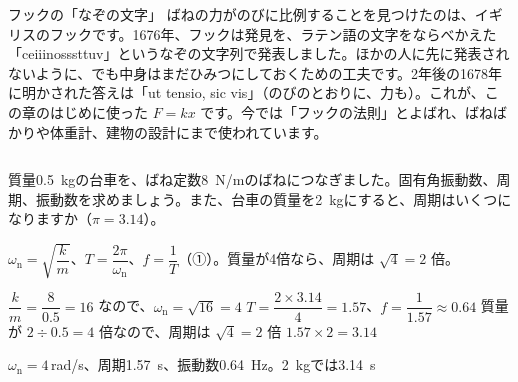 \begin{kotoba}
\small
{}
\end{kotoba}

{}

\begin{column}{フックの「なぞの文字」}
ばねの力がのびに比例することを見つけたのは、イギリスのフックです。1676年、フックは発見を、ラテン語の文字をならべかえた「\mbox{ceiiinosssttuv}」というなぞの文字列で発表しました。ほかの人に先に発表されないように、でも中身はまだひみつにしておくための工夫です。2年後の1678年に明かされた答えは「ut tensio, sic vis」（のびのとおりに、力も）。これが、この章のはじめに使った $F=kx$ です。今では「フックの法則」とよばれ、ばねばかりや体重計、建物の設計にまで使われています。
\end{column}


\begin{reidai}[ばねの固有角振動数と周期]
質量\qty{0.5}{kg}の台車を、ばね定数\qty{8}{N/m}のばねにつなぎました。固有角振動数、周期、振動数を求めましょう。また、台車の質量を\qty{2}{kg}にすると、周期はいくつになりますか（$\pi=3.14$）。\par
\kangaekata $\omega_{\mathrm n}=\sqrt{\dfrac{k}{m}}$、$T=\dfrac{2\pi}{\omega_{\mathrm n}}$、$f=\dfrac{1}{T}$（①）。質量が4倍なら、周期は $\sqrt4=2$ 倍。\par
\shiki
\kviga $\dfrac{k}{m}=\dfrac{8}{0.5}=16$ なので、$\omega_{\mathrm n}=\sqrt{16}=4$
\kviga $T=\dfrac{2\times3.14}{4}=1.57$、\quad $f=\dfrac{1}{1.57}\approx0.64$
\kviga 質量が $2\div0.5=4$ 倍なので、周期は $\sqrt4=2$ 倍
\kviga $1.57\times2=3.14$\par
\kotae $\omega_{\mathrm n}=4$\,rad/s、周期\qty{1.57}{s}、振動数\qty{0.64}{Hz}。\qty{2}{kg}では\qty{3.14}{s}
\end{reidai}

